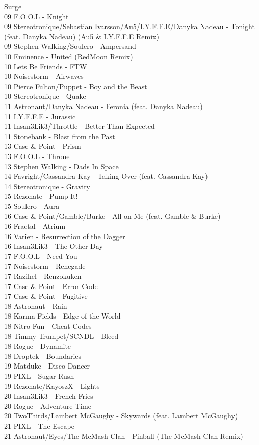 \begin{multicols}{2}
Surge\\ 09 F.O.O.L - Knight\\ 09 Stereotronique/Sebastian Ivarsson/Au5/I.Y.F.F.E/Danyka Nadeau - Tonight (feat. Danyka Nadeau) (Au5 \& I.Y.F.F.E Remix)\\ 09 Stephen Walking/Soulero - Ampersand\\ 10 Eminence - United (RedMoon Remix)\\ 10 Lets Be Friends - FTW\\ 10 Noisestorm - Airwaves\\ 10 Pierce Fulton/Puppet - Boy and the Beast\\ 10 Stereotronique - Quake\\ 11 Astronaut/Danyka Nadeau - Feronia (feat. Danyka Nadeau)\\ 11 I.Y.F.F.E - Jurassic\\ 11 Insan3Lik3/Throttle - Better Than Expected\\ 11 Stonebank - Blast from the Past\\ 13 Case \& Point - Prism\\ 13 F.O.O.L - Throne\\ 13 Stephen Walking - Dads In Space\\ 14 Favright/Cassandra Kay - Taking Over (feat. Cassandra Kay)\\ 14 Stereotronique - Gravity\\ 15 Rezonate - Pump It!\\ 15 Soulero - Aura\\ 16 Case \& Point/Gamble/Burke - All on Me (feat. Gamble \& Burke)\\ 16 Fractal - Atrium\\ 16 Varien - Resurrection of the Dagger\\ 16 Insan3Lik3 - The Other Day\\ 17 F.O.O.L - Need You\\ 17 Noisestorm - Renegade\\ 17 Razihel - Renzokuken\\ 17 Case \& Point - Error Code\\ 17 Case \& Point - Fugitive\\ 18 Astronaut - Rain\\ 18 Karma Fields - Edge of the World\\ 18 Nitro Fun - Cheat Codes\\ 18 Timmy Trumpet/SCNDL - Bleed\\ 18 Rogue - Dynamite\\ 18 Droptek - Boundaries\\ 19 Matduke - Disco Dancer\\ 19 PIXL - Sugar Rush\\ 19 Rezonate/KayoszX - Lights\\ 20 Insan3Lik3 - French Fries\\ 20 Rogue - Adventure Time\\ 20 TwoThirds/Lambert McGaughy - Skywards (feat. Lambert McGaughy)\\ 21 PIXL - The Escape\\ 21 Astronaut/Eyes/The McMash Clan - Pinball (The McMash Clan Remix)\\ 
\end{multicols}

